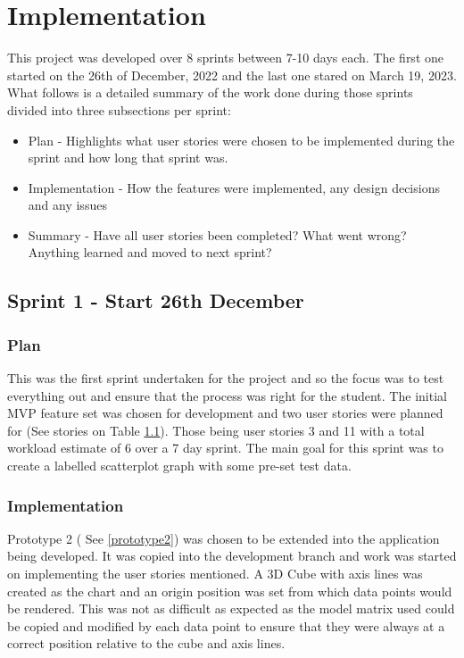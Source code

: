 
\section{Implementation} \label{implementation}
This project was developed over 8 sprints between 7-10 days each. The first one started on the 26th of December, 2022 and the last one stared on March 19, 2023. What follows is a detailed summary of the work done during those sprints divided into three subsections per sprint:
\begin{itemize}
    \item Plan - Highlights what user stories were chosen to be implemented during the sprint and how long that sprint was.
    \item Implementation - How the features were implemented, any design decisions and any issues
    \item Summary - Have all user stories been completed? What went wrong? Anything learned and moved to next sprint?
\end{itemize}

\subsection{Sprint 1 - Start 26th December} \label{sprint1}
\subsubsection{Plan}
This was the first sprint undertaken for the project and so the focus was to test everything out and ensure that the process was right for the student. The initial MVP feature set was chosen for development and two user stories were planned for (See stories on Table \ref{sprint1}). Those being user stories 3 and 11 with a total workload estimate of 6 over a 7 day sprint. The main goal for this sprint was to create a labelled scatterplot graph with some pre-set test data.

\subsubsection{Implementation}
Prototype 2 ( See \ref{prototype2}) was chosen to be extended into the application being developed. It was copied into the development branch and work was started on implementing the user stories mentioned. A 3D Cube with axis lines was created as the chart and an origin position was set from which data points would be rendered. This was not as difficult as expected as the model matrix used could be copied and modified by each data point to ensure that they were always at a correct position relative to the cube and axis lines.

